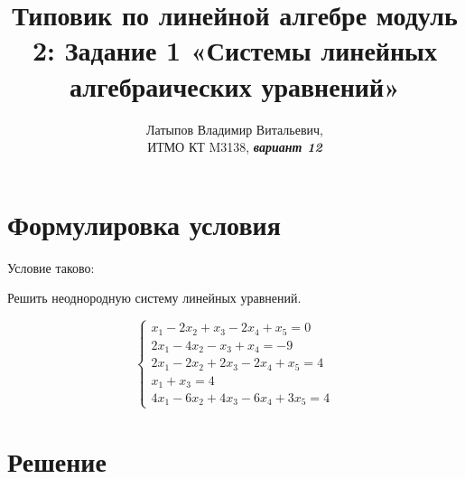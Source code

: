 \documentclass[12pt, a4paper]{article}
\author{Латыпов Владимир Витальевич, \\ ИТМО КТ M3138, \Huge{\textit{\textbf{вариант 12}}}}
\title{Типовик по линейной алгебре модуль 2: Задание 1 «Системы линейных алгебраических уравнений»}
\begin{document}
    \tit

    \section{Формулировка условия}

    \begin{statement}
        Условие таково: 
        
        Решить неоднородную систему линейных уравнений.

        \begin{equation}
            \begin{cases}
                x_1 − 2x_2 + x_3 − 2x_4 + x_5 = 0 \\
                2x_1 − 4x_2 − x_3 + x_4 = −9 \\
                2x_1 − 2x_2 + 2x_3 − 2x_4 + x_5 = 4 \\
                x_1 + x_3 = 4 \\
                4x_1 − 6x_2 + 4x_3 − 6x_4 + 3x_5 = 4
            \end{cases}
        \end{equation}
            
    \end{statement}

    \section{Решение}
\end{document}

